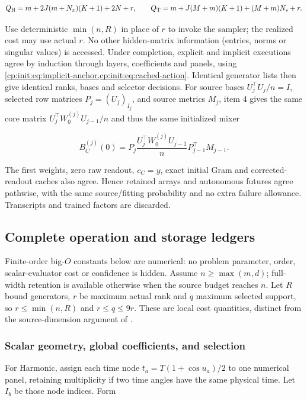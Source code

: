 \begin{equation}
\label{cp:init:eq:query-counts}
Q_{\rm H}=m+2J(m+N_x)(K+1)+2N+r,\qquad
Q_{\rm T}=m+J(M+m)(K+1)+(M+m)N_s+r.
\end{equation}

Use deterministic $\min(n,R)$ in place of $r$ to invoke the sampler;
the realized cost may use actual $r$. No other hidden-matrix information
(entries, norms or singular values) is accessed.
Under completion, explicit and implicit executions agree by induction
through layers, coefficients and panels, using
\cref{cp:init:eq:implicit-anchor,cp:init:eq:cached-action}.
Identical generator lists then give identical ranks, bases and selector
decisions. For source bases
$U_j^\top U_j/n=I$, selected row matrices $P_j=(U_j)_{I_j}$,
and source metrics $M_j$, item 4 gives the same core matrix
$U_j^\top W_0^{(j)}U_{j-1}/n$ and thus the same initialized mixer

\[
B_C^{(j)}(0)=P_j\frac{U_j^\top W_0^{(j)}U_{j-1}}n
                         P_{j-1}^\top M_{j-1}.
\]

The first weights, zero raw readout, $c_C=y$, exact initial Gram and
corrected-readout caches also agree. Hence retained arrays and autonomous
futures agree pathwise, with the same source/fitting probability and no
extra failure allowance. Transcripts and trained factors are discarded.

\subsection{Complete operation and storage ledgers}
\label{cp:init:sec:costs}

Finite-order big-$O$ constants below are numerical: no problem parameter,
order, scalar-evaluator cost or confidence is hidden. Assume
$n\ge\max(m,d)$; full-width retention is available otherwise when
the source budget reaches $n$. Let $R$ bound generators, $r$ be maximum
actual rank and $q$ maximum selected support, so
$r\le\min(n,R)$ and $r\le q\le9r$. These are local cost
quantities, distinct from the source-dimension argument of .

\subsubsection{Scalar geometry, global coefficients, and selection}
\label{cp:init:sec:geometry-cost}

For Harmonic, assign each time node $t_a=T(1+\cos u_a)/2$ to
one numerical panel, retaining multiplicity if two time angles have the
same physical time. Let $I_b$ be those node indices. Form

